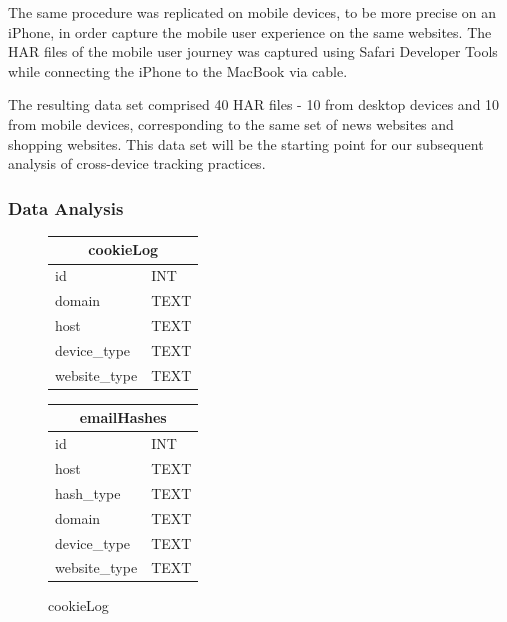 The same procedure was replicated on mobile devices, to be more precise on an iPhone, in order capture the mobile user experience on the same websites. The HAR files of the mobile user journey was captured using Safari Developer Tools while connecting the iPhone to the MacBook via cable.

The resulting data set comprised 40 HAR files - 10 from desktop devices and 10 from mobile devices, corresponding to the same set of news websites and shopping websites. This data set will be the starting point for our subsequent analysis of cross-device tracking practices.
\subsubsection{Data Analysis}

\begin{figure}[ht]
    \centering
    \begin{subtable}[b]{0.3\textwidth}
        \centering
        \begin{tabular}{|l|l|}
            \hline
            \multicolumn{2}{|c|}{\textbf{cookieLog}} \\
            \hline
            id           & INT \\
            domain       & TEXT \\
            host         & TEXT \\
            device\_type  & TEXT \\
            website\_type & TEXT \\
            \hline
        \end{tabular}
        \caption{cookieLog}
    \end{subtable}
    \hfill
    \begin{subtable}[b]{0.3\textwidth}
        \centering
        \begin{tabular}{|l|l|}
            \hline
            \multicolumn{2}{|c|}{\textbf{emailHashes}} \\
            \hline
            id           & INT \\
            host         & TEXT \\
            hash\_type    & TEXT \\
            domain       & TEXT \\
            device\_type  & TEXT \\
            website\_type & TEXT \\
            \hline
        \end{tabular}

\end{subtable}
\end{figure}

